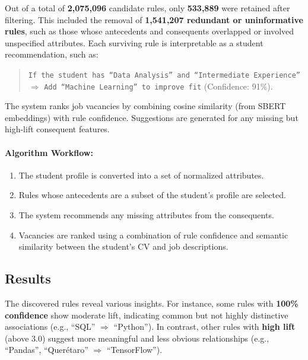 \documentclass[12pt,a4paper]{article}
\begin{document}
	Out of a total of \textbf{2,075,096} candidate rules, only \textbf{533,889} were retained after filtering. This included the removal of \textbf{1,541,207 redundant or uninformative rules}, such as those whose antecedents and consequents overlapped or involved unspecified attributes. Each surviving rule is interpretable as a student recommendation, such as:
	
	\begin{quote}
		\small
		\texttt{If the student has “Data Analysis” and “Intermediate Experience”} $\Rightarrow$ \texttt{Add “Machine Learning” to improve fit} (Confidence: 91\%).
	\end{quote}
	
	The system ranks job vacancies by combining cosine similarity (from SBERT embeddings) with rule confidence. Suggestions are generated for any missing but high-lift consequent features.
	
	\vspace{0.5em}
	
	
	\paragraph{Algorithm Workflow:}
	\begin{enumerate}
		\item The student profile is converted into a set of normalized attributes.
		\item Rules whose antecedents are a subset of the student's profile are selected.
		\item The system recommends any missing attributes from the consequents.
		\item Vacancies are ranked using a combination of rule confidence and semantic similarity between the student's CV and job descriptions.
	\end{enumerate}
	
	\subsection{Results}
	
	The discovered rules reveal various insights. For instance, some rules with \textbf{100\% confidence} show moderate lift, indicating common but not highly distinctive associations (e.g., ``SQL'' $\Rightarrow$ ``Python''). In contrast, other rules with \textbf{high lift} (above 3.0) suggest more meaningful and less obvious relationships (e.g., ``Pandas'', ``Querétaro'' $\Rightarrow$ ``TensorFlow'').
	
\end{document}

